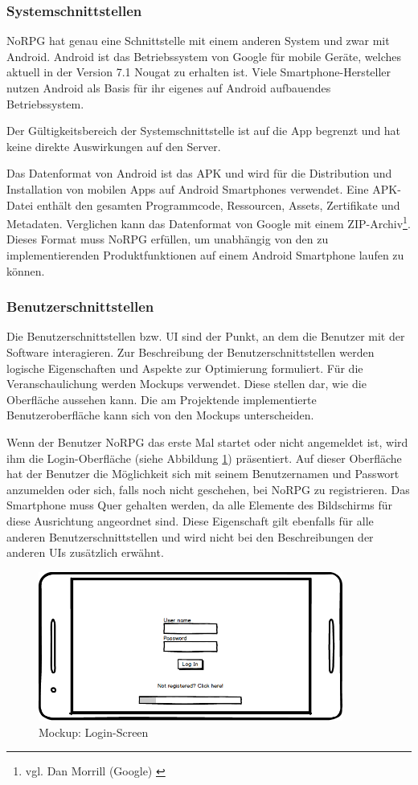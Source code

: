 		\subsubsection{Systemschnittstellen}
			NoRPG hat genau eine Schnittstelle mit einem anderen System und zwar mit Android. Android ist das Betriebssystem von Google für mobile Geräte, welches aktuell in der Version 7.1 Nougat zu erhalten ist. Viele Smartphone-Hersteller nutzen Android als Basis für ihr eigenes auf Android aufbauendes Betriebssystem. 
			
			Der Gültigkeitsbereich der Systemschnittstelle ist auf die App begrenzt und hat keine direkte Auswirkungen auf den Server. 
			
			Das Datenformat von Android ist das \ac{APK} und wird für die Distribution und Installation von mobilen Apps auf Android Smartphones verwendet. Eine \ac{APK}-Datei enthält den gesamten Programmcode, Ressourcen, Assets, Zertifikate und Metadaten. Verglichen kann das Datenformat von Google mit einem ZIP-Archiv\footnote{vgl. Dan Morrill (Google) \cite{google1}}. Dieses Format muss NoRPG erfüllen, um unabhängig von den zu implementierenden Produktfunktionen auf einem Android Smartphone laufen zu können.
			
		\subsubsection{Benutzerschnittstellen}
			Die Benutzerschnittstellen bzw. \ac{UI} sind der Punkt, an dem die Benutzer mit der Software interagieren. Zur Beschreibung der Benutzerschnittstellen werden logische Eigenschaften und Aspekte zur Optimierung formuliert. Für die Veranschaulichung werden Mockups verwendet. Diese stellen dar, wie die Oberfläche aussehen kann. Die am Projektende implementierte Benutzeroberfläche kann sich von den Mockups unterscheiden.
			
			Wenn der Benutzer NoRPG das erste Mal startet oder nicht angemeldet ist, wird ihm die Login-Oberfläche (siehe Abbildung \ref{mockupLogin}) präsentiert. Auf dieser Oberfläche hat der Benutzer die Möglichkeit sich mit seinem Benutzernamen und Passwort anzumelden oder sich, falls noch nicht geschehen, bei NoRPG zu registrieren. Das Smartphone muss Quer gehalten werden, da alle Elemente des Bildschirms für diese Ausrichtung angeordnet sind. Diese Eigenschaft gilt ebenfalls für alle anderen Benutzerschnittstellen und wird nicht bei den Beschreibungen der anderen \acp{UI} zusätzlich erwähnt.  
			
			\begin{figure}[htbp]
				\centering 
				\label{mockupLogin}
				\includegraphics[width=10cm]{pics/Login.png}
				\caption{Mockup: Login-Screen}
			\end{figure}
			
